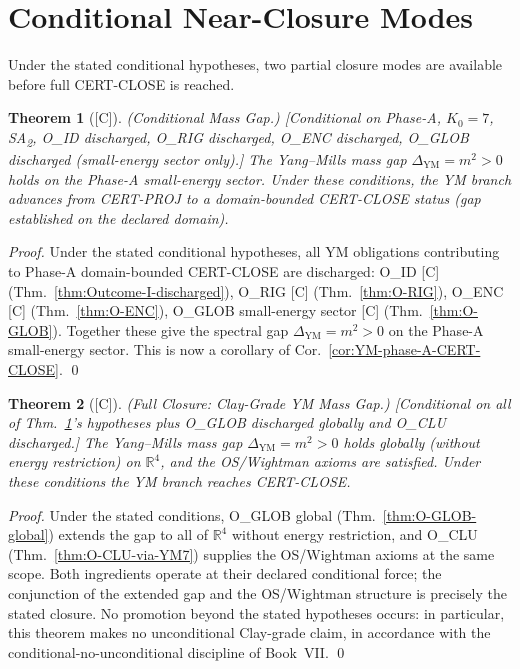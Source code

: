 \documentclass[12pt,oneside]{amsbook}
\theoremstyle{plain}
\newtheorem{theorem}{Theorem}[section]
\theoremstyle{definition}
\theoremstyle{remark}
\newcommand{\status}[1]{\textup{[#1]}}
\begin{document}
\section{Conditional Near-Closure Modes}
\label{sec:near-closure}

Under the stated conditional hypotheses, two partial closure
modes are available before full CERT-CLOSE is reached.

\begin{theorem}[\status{C}]\label{thm:YM-cond-mass-gap}
\textup{(Conditional Mass Gap.)}
\textup{[Conditional on Phase-A, $K_0=7$, SA\textsubscript{2},
O\_ID discharged, O\_RIG discharged, O\_ENC discharged, O\_GLOB
discharged (small-energy sector only).]}
The Yang--Mills mass gap $\Delta_{\mathrm{YM}} = m^2 > 0$ holds
on the Phase-A small-energy sector. Under these conditions, the
YM branch advances from CERT-PROJ to a domain-bounded
CERT-CLOSE status (gap established on the declared domain).
\end{theorem}
\begin{proof}
Under the stated conditional hypotheses, all YM obligations
contributing to Phase-A domain-bounded CERT-CLOSE are
discharged: O\_ID [C] (Thm.~\ref{thm:Outcome-I-discharged}),
O\_RIG [C] (Thm.~\ref{thm:O-RIG}), O\_ENC [C] (Thm.~\ref{thm:O-ENC}),
O\_GLOB small-energy sector [C] (Thm.~\ref{thm:O-GLOB}).
Together these give the spectral gap $\Delta_{\mathrm{YM}} = m^2 > 0$
on the Phase-A small-energy sector.
This is now a corollary of Cor.~\ref{cor:YM-phase-A-CERT-CLOSE}. \qed
\end{proof}


\begin{theorem}[\status{C}]\label{thm:YM-full-closure}
\textup{(Full Closure: Clay-Grade YM Mass Gap.)}
\textup{[Conditional on all of Thm.~\ref{thm:YM-cond-mass-gap}'s
hypotheses plus O\_GLOB discharged globally and O\_CLU
discharged.]}
The Yang--Mills mass gap $\Delta_{\mathrm{YM}} = m^2 > 0$ holds
globally (without energy restriction) on $\mathbb{R}^4$, and the
OS/Wightman axioms are satisfied. Under these conditions the YM
branch reaches CERT-CLOSE.
\end{theorem}
\begin{proof}
Under the stated conditions, O\_GLOB global
(Thm.~\ref{thm:O-GLOB-global}) extends the gap to all of
$\mathbb{R}^4$ without energy restriction, and O\_CLU
(Thm.~\ref{thm:O-CLU-via-YM7}) supplies the OS/Wightman axioms
at the same scope. Both ingredients operate at their declared
conditional force; the conjunction of the extended gap and the
OS/Wightman structure is precisely the stated closure. No
promotion beyond the stated hypotheses occurs: in particular,
this theorem makes no unconditional Clay-grade claim, in
accordance with the conditional-no-unconditional discipline of
Book~VII. \qed
\end{proof}
\end{document}
